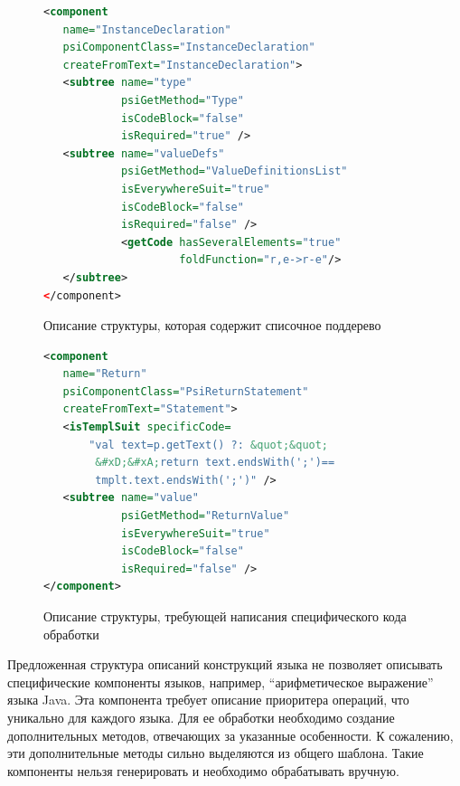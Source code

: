 \begin{figure}[H]
    \begin{lstlisting}[language=xml,basicstyle=\scriptsize]
<component 
   name="InstanceDeclaration" 
   psiComponentClass="InstanceDeclaration" 
   createFromText="InstanceDeclaration">        
   <subtree name="type" 
            psiGetMethod="Type"
            isCodeBlock="false" 
            isRequired="true" />        
   <subtree name="valueDefs"   
            psiGetMethod="ValueDefinitionsList" 
            isEverywhereSuit="true"  
            isCodeBlock="false"    
            isRequired="false" />            
            <getCode hasSeveralElements="true" 
                     foldFunction="r,e->r-e"/>        
   </subtree>
</component>
    \end{lstlisting}
\caption{Описание структуры, которая содержит списочное поддерево}    
\label{oneList}
\end{figure}

\begin{figure}[H]
    \begin{lstlisting}[language=xml,basicstyle=\scriptsize]
<component 
   name="Return" 
   psiComponentClass="PsiReturnStatement" 
   createFromText="Statement">
   <isTemplSuit specificCode=
       "val text=p.getText() ?: &quot;&quot;
        &#xD;&#xA;return text.endsWith(';')==
        tmplt.text.endsWith(';')" />        
   <subtree name="value"             
            psiGetMethod="ReturnValue" 
            isEverywhereSuit="true"  
            isCodeBlock="false" 
            isRequired="false" />
</component>
    \end{lstlisting}
\caption{Описание структуры, требующей написания специфического кода обработки}    
\label{specificCode}
\end{figure}


Предложенная структура описаний конструкций языка не позволяет описывать специфические компоненты языков, например, ``арифметическое выражение'' языка Java. Эта компонента требует описание приоритера операций, что уникально для каждого языка. Для ее обработки необходимо создание дополнительных методов, отвечающих за указанные особенности. К сожалению, эти дополнительные методы сильно выделяются из общего шаблона. Такие компоненты нельзя генерировать и необходимо обрабатывать вручную. 

